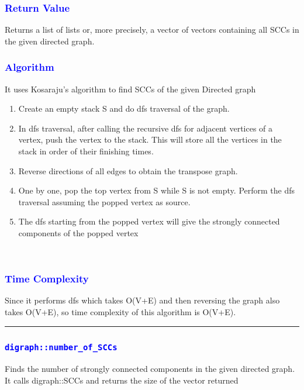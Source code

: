 \documentclass[11pt,a4paper]{article}
\begin{document}
\subsubsection*{\textcolor{blue}{ \large {Return Value}}}
Returns a list of lists or, more precisely, a vector of vectors containing all SCCs in the given directed graph.
\subsubsection*{\textcolor{blue}{ \large {Algorithm
}}}
It uses Kosaraju's algorithm to find SCCs of the given Directed graph
\begin{enumerate}  
\item Create an empty stack S and do dfs traversal of the graph.
\item  In dfs traversal, after calling the recursive dfs for adjacent vertices of a vertex, push the vertex to the stack. This will store all the vertices in the stack in order of their finishing times.

\item Reverse directions of all edges to obtain the transpose graph.

\item  One by one, pop the top vertex from S while S is not empty. Perform the dfs traversal assuming the popped vertex as source.

\item The dfs starting from the popped vertex will give the strongly connected components of the popped vertex
\end{enumerate}  
\\
\subsubsection*{\textcolor{blue}{ \large {Time Complexity}}}
Since it performs dfs which takes O(V+E) and then reversing the graph also takes O(V+E), so time complexity of this algorithm is O(V+E).

\rule{17cm}{0.1mm}


\subsubsection*{\textcolor{blue}{\Large\texttt{digraph::number\_of\_SCCs}}}
Finds the number of strongly connected components in the given directed graph. It calls digraph::SCCs and returns the size of the vector returned
\end{document}

